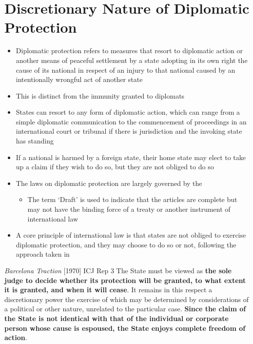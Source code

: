 \section{Discretionary Nature of Diplomatic Protection}
\begin{itemize}
    \item Diplomatic protection refers to measures that resort to diplomatic action or another means of peaceful settlement by a state adopting in its own right the cause of its national in respect of an injury to that national caused by an intentionally wrongful act of another state
    \item This is distinct from the immunity granted to diplomats
    \item States can resort to any form of diplomatic action, which can range from a simple diplomatic communication to the commencement of proceedings in an international court or tribunal if there is jurisdiction and the invoking state has standing
    \item If a national is harmed by a foreign state, their home state may elect to take up a claim if they wish to do so, but they are not obliged to do so
    \item The laws on diplomatic protection are largely governed by the 
    \begin{itemize}
        \item The term `Draft' is used to indicate that the articles are complete but may not have the binding force of a treaty or another instrument of international law
    \end{itemize}
    \item A core principle of international law is that states are not obliged to exercise diplomatic protection, and they may choose to do so or not, following the approach taken in 
\end{itemize}

\begin{casedetails}{\textit{Barcelona Traction} [1970] ICJ Rep 3}
    \flushleft
    The State must be viewed as \textbf{the sole judge to decide whether its protection will be granted, to what extent it is granted, and when it will cease}. It remains in this respect a discretionary power the exercise of which may be determined by considerations of a political or other nature, unrelated to the particular case. \textbf{Since the claim of the State is not identical with that of the individual or corporate person whose cause is espoused, the State enjoys complete freedom of action}.
\end{casedetails}

